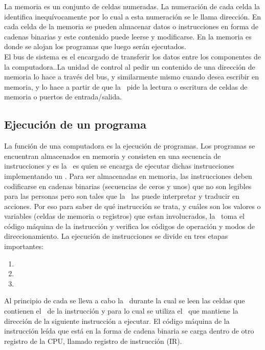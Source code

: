 La memoria es un conjunto de celdas numeradas. La numeración de cada celda la identifica inequívocamente por lo cual a esta numeración se le llama dirección. En cada celda de la memoria se pueden almacenar datos o instrucciones en forma de cadenas binarias y este contenido puede leerse y modificarse. En la memoria es donde se alojan los programas que luego serán ejecutados.\\

El bus de sistema es el encargado de transferir los datos entre los componentes de la computadora..La unidad de control al pedir un contenido de una dirección de memoria lo hace a través del bus, y similarmente mismo cuando desea escribir en memoria, y lo hace a partir de que la \UC\ pide la lectura o escritura de celdas de memoria o puertos de entrada/salida.

\subsection{Ejecución de un programa}

La función de una computadora es la ejecución de programas. Los programas se encuentran almacenados en memoria y consisten en una secuencia de instrucciones y es la \UC\ es quien se encarga de ejecutar dichas instrucciones implementando un \textbf{\ciclo}. Para ser almacenadas en memoria, las instrucciones deben codificarse en cadenas binarias (secuencias de ceros y unos) que no son legibles para las personas pero son tales que la \UC\ las puede interpretar y traducir en acciones. Por eso para saber de qué instrucción se trata, y cuáles son los valores o variables (celdas de memoria o registros) que estan involucrados, la \UC\ toma el código máquina de la instrucción y verifica los códigos de operación y modos de direccionamiento. La ejecución de instrucciones se divide en tres etapas importantes: 

\begin{enumerate}
\item \BI
\item \DI
\item \EI
\end{enumerate}


Al principio de cada \ciclo se lleva a cabo la \BI\ durante la cual se leen las celdas que contienen el \codmaq\ de la instrucción y para lo cual se utiliza el \PC\ que mantiene la dirección de la siguiente instrucción a ejecutar.
El código máquina de la instrucción leída que está en la forma de cadena binaria se carga dentro de otro registro de la CPU, llamado registro de instrucción (IR).\\

